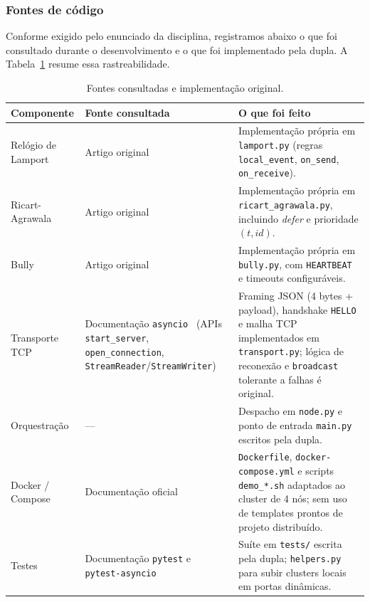 \documentclass[10pt, a4paper, titlepage]{extarticle}
\begin{document}
\subsubsection{Fontes de código}
\label{sec:fontes}
Conforme exigido pelo enunciado da disciplina, registramos abaixo o que foi consultado durante o desenvolvimento e o que foi implementado pela dupla. A Tabela~\ref{tab:fontes} resume essa rastreabilidade.

\begin{table}[ht]
  \centering
  \caption{Fontes consultadas e implementação original.}
  \label{tab:fontes}
  \small
  \begin{tabular}{@{}p{3.2cm}p{4.5cm}p{5.5cm}@{}}
    \toprule
    Componente & Fonte consultada & O que foi feito \\
    \midrule
    Relógio de Lamport &
    Artigo original~\cite{lamport1978} &
    Implementação própria em \texttt{lamport.py} (regras \texttt{local\_event}, \texttt{on\_send}, \texttt{on\_receive}). \\[0.3em]
    Ricart-Agrawala &
    Artigo original~\cite{ricart1981} &
    Implementação própria em \texttt{ricart\_agrawala.py}, incluindo \emph{defer} e prioridade $(t, \mathit{id})$. \\[0.3em]
    Bully &
    Artigo original~\cite{garcia1982} &
    Implementação própria em \texttt{bully.py}, com \texttt{HEARTBEAT} e timeouts configuráveis. \\[0.3em]
    Transporte TCP &
    Documentação \texttt{asyncio}~\cite{python-asyncio} (APIs \texttt{start\_server}, \texttt{open\_connection}, \texttt{StreamReader}/\texttt{StreamWriter}) &
    Framing JSON (4 bytes + payload), handshake \texttt{HELLO} e malha TCP implementados em \texttt{transport.py}; lógica de reconexão e \texttt{broadcast} tolerante a falhas é original. \\[0.3em]
    Orquestração &
    --- &
    Despacho em \texttt{node.py} e ponto de entrada \texttt{main.py} escritos pela dupla. \\[0.3em]
    Docker / Compose &
    Documentação oficial~\cite{docker-compose} &
    \texttt{Dockerfile}, \texttt{docker-compose.yml} e scripts \texttt{demo\_*.sh} adaptados ao cluster de 4 nós; sem uso de templates prontos de projeto distribuído. \\[0.3em]
    Testes &
    Documentação \texttt{pytest} e \texttt{pytest-asyncio} &
    Suíte em \texttt{tests/} escrita pela dupla; \texttt{helpers.py} para subir clusters locais em portas dinâmicas. \\
    \bottomrule
  \end{tabular}
\end{table}
\end{document}
